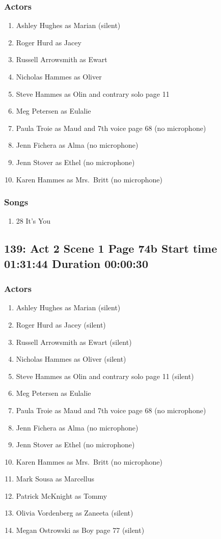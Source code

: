 \subsubsection{Actors}
\begin{enumerate}
\item Ashley Hughes as Marian (silent)
\item Roger Hurd as Jacey
\item Russell Arrowsmith as Ewart
\item Nicholas Hammes as Oliver
\item Steve Hammes as Olin and contrary solo page 11
\item Meg Petersen as Eulalie
\item Paula Troie as Maud and 7th voice page 68 (no microphone)
\item Jenn Fichera as Alma (no microphone)
\item Jenn Stover as Ethel (no microphone)
\item Karen Hammes as Mrs.~Britt (no microphone)
\end{enumerate}

\subsubsection{Songs}
\begin{enumerate}
\item 28 It's You
\end{enumerate}
\subsection{139: Act 2 Scene 1 Page 74b Start time 01:31:44 Duration 00:00:30}

\subsubsection{Actors}
\begin{enumerate}
\item Ashley Hughes as Marian (silent)
\item Roger Hurd as Jacey (silent)
\item Russell Arrowsmith as Ewart (silent)
\item Nicholas Hammes as Oliver (silent)
\item Steve Hammes as Olin and contrary solo page 11 (silent)
\item Meg Petersen as Eulalie
\item Paula Troie as Maud and 7th voice page 68 (no microphone)
\item Jenn Fichera as Alma (no microphone)
\item Jenn Stover as Ethel (no microphone)
\item Karen Hammes as Mrs.~Britt (no microphone)
\item Mark Sousa as Marcellus
\item Patrick McKnight as Tommy
\item Olivia Vordenberg as Zaneeta (silent)
\item Megan Ostrowski as Boy page 77 (silent)
\end{enumerate}


